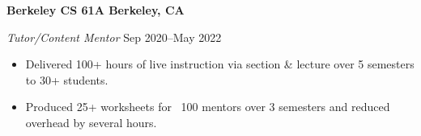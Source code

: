\textbf{Berkeley CS 61A \hfill Berkeley, CA} \par
\textit{Tutor/Content Mentor} \hfill Sep 2020--May 2022 \par
\begin{itemize}
	\item Delivered 100+ hours of live instruction via section \& lecture over 5 semesters to 30+ students.
	\item Produced 25+ worksheets for ~100 mentors over 3 semesters and reduced overhead by several hours.
\end{itemize}\par